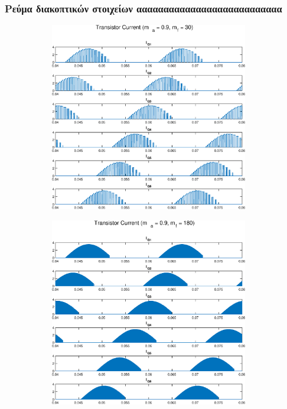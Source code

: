\subsubsection*{Ρεύμα διακοπτικών στοιχείων ααααααααααααααααααααααααααα}
\begin{figure}[h!]
	\begin{subfigure}{0.49\textwidth}
		\centering
		\includegraphics[width=0.95\textwidth]{Images/4_I_Q_30.eps}
	\end{subfigure}
	\begin{subfigure}{0.49\textwidth}
		\centering
		\includegraphics[width=0.95\textwidth]{Images/4_I_Q_180.eps}
	\end{subfigure}
\end{figure}

